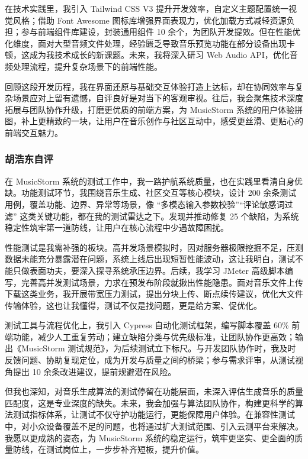 \documentclass{base}
\numberwithin{figure}{section} %
\begin{document}
在技术实践里，我引入 Tailwind CSS V3 提升开发效率，自定义主题配置统一视觉风格；借助 Font Awesome 图标库增强界面表现力，优化加载方式减轻资源负担；参与前端组件库建设，封装通用组件 10 余个，为团队开发提效。但在性能优化维度，面对大型音频文件处理，经验匮乏导致音乐预览功能在部分设备出现卡顿，这成为我技术成长的新课题。未来，我将深入研习 Web Audio API，优化音频处理流程，提升复杂场景下的前端性能。

回顾这段开发历程，我在界面还原与基础交互体验打造上达标，却在协同效率与复杂场景应对上留有遗憾，自评良好是对当下的客观审视。往后，我会聚焦技术深度拓展与团队协作升级，打磨更优质的前端方案，为 MusicStorm 系统的用户体验拼图，补上更精致的一块，让用户在音乐创作与社区互动中，感受更丝滑、更贴心的前端交互魅力。

\newpage
\subsubsection{胡浩东自评}

在 MusicStorm 系统的测试工作中，我一路护航系统质量，也在实践里看清自身优缺。功能测试环节，我围绕音乐生成、社区交互等核心模块，设计 200 余条测试用例，覆盖功能、边界、异常等场景，像 “多模态输入参数校验”“评论敏感词过滤” 这类关键功能，都在我的测试雷达之下。发现并推动修复 25 个缺陷，为系统稳定性筑牢第一道防线，让用户在核心流程中少遇故障困扰。

性能测试是我需补强的板块。高并发场景模拟时，因对服务器极限挖掘不足，压测数据未能充分暴露潜在问题，系统上线后出现短暂性能波动，这让我明白，测试不能只做表面功夫，要深入探寻系统承压边界。后续，我学习 JMeter 高级脚本编写，完善高并发测试场景，力求在预发布阶段就揪出性能隐患。面对音乐文件上传下载这类业务，我开展带宽压力测试，提出分块上传、断点续传建议，优化大文件传输体验，这也让我懂得，测试不仅是找问题，更是给方案、促优化。

测试工具与流程优化上，我引入 Cypress 自动化测试框架，编写脚本覆盖 60\% 前端功能，减少人工重复劳动；建立缺陷分类与优先级标准，让团队协作更高效；输出《MusicStorm 测试规范》，为后续测试立下标尺。与开发团队协作时，我及时反馈问题、协助复现定位，成为开发与质量之间的桥梁；参与需求评审，从测试视角提出 10 余条改进建议，提前规避潜在风险。

但我也深知，对音乐生成算法的测试停留在功能层面，未深入评估生成音乐的质量匹配度，这是专业深度的缺失。未来，我会加强与算法团队协作，构建更科学的算法测试指标体系，让测试不仅守护功能运行，更能保障用户体验。在兼容性测试中，对小众设备覆盖不足的问题，也将通过扩大测试范围、引入云测平台来解决。我愿以更成熟的姿态，为 MusicStorm 系统的稳定运行，筑牢更坚实、更全面的质量防线，在测试岗位上，一步步补齐短板，提升价值。
\end{document}
